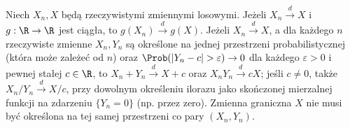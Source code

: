 \begin{twierdzenie}
Niech $X_n,X$ będą rzeczywistymi zmiennymi losowymi.
Jeżeli $X_n\xrightarrow{d}X$ i $g:\R\to\R$ jest ciągła,
to $g(X_n)\xrightarrow{d}g(X)$.
Jeżeli $X_n\xrightarrow{d}X$, a dla każdego $n$
rzeczywiste zmienne $X_n,Y_n$ są określone na jednej
przestrzeni probabilistycznej (która może zależeć od $n$)
oraz $\Prob(|Y_n-c|>\varepsilon)\to0$ dla każdego
$\varepsilon>0$ i pewnej stałej
$c\in\R$, to
$X_n+Y_n\xrightarrow{d}X+c$ oraz
$X_nY_n\xrightarrow{d}cX$; jeśli $c\ne0$, także
$X_n/Y_n\xrightarrow{d}X/c$, przy dowolnym określeniu
ilorazu jako skończonej mierzalnej funkcji
na zdarzeniu $\{Y_n=0\}$ (np. przez zero).
Zmienna graniczna $X$ nie musi być określona na tej
samej przestrzeni co pary $(X_n,Y_n)$.
\end{twierdzenie}
